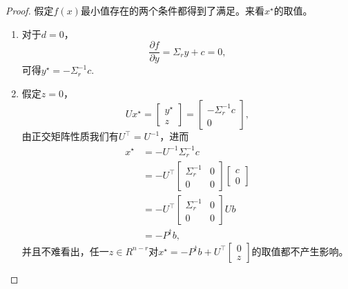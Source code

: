 \begin{subappendices}
\begin{proof}
  假定$f(x)$最小值存在的两个条件都得到了满足。来看$x^{\star}$的取值。
\begin{enumerate}

  \item 对于$d=0$，\begin{equation*}
  \frac{\partial f}{\partial y} = \Sigma_r y + c = 0,
  \end{equation*}
  可得$y^{\star} = -\Sigma_r ^{-1} c$.

  \item 假定$z=0$，\begin{equation*}
  U x^{\star} = \begin{bmatrix}
  y^{\star} \\ z
\end{bmatrix} = \begin{bmatrix}
  -\Sigma_r ^{-1} c \\ 0
\end{bmatrix},
  \end{equation*}
由正交矩阵性质我们有$U^{\top} = U^{-1}$，进而
\begin{equation}
\label{eq:simple-schulr-optimum-x-value}
\begin{split}
    x^{\star} &= - U^{-1}  \Sigma_r ^{-1} c \\
    &= - U^{\top} \begin{bmatrix}
    \Sigma_{r}^{-1} & 0 \\
    0 & 0
    \end{bmatrix}
    \begin{bmatrix}
      c \\ 0
    \end{bmatrix} \\
    &= - U^{\top} \begin{bmatrix}
    \Sigma_{r}^{-1} & 0 \\
    0 & 0
    \end{bmatrix} Ub \\
    &= -P^{\dagger} b,
\end{split}
\end{equation}
并且不难看出，任一$z \in R^{n-r}$对$x^{\star}=-P^{\dagger} b + U^{\top} \begin{bmatrix} 0 \\ z \end{bmatrix}$的取值都不产生影响。
\end{enumerate}


\end{proof}
\end{subappendices}
